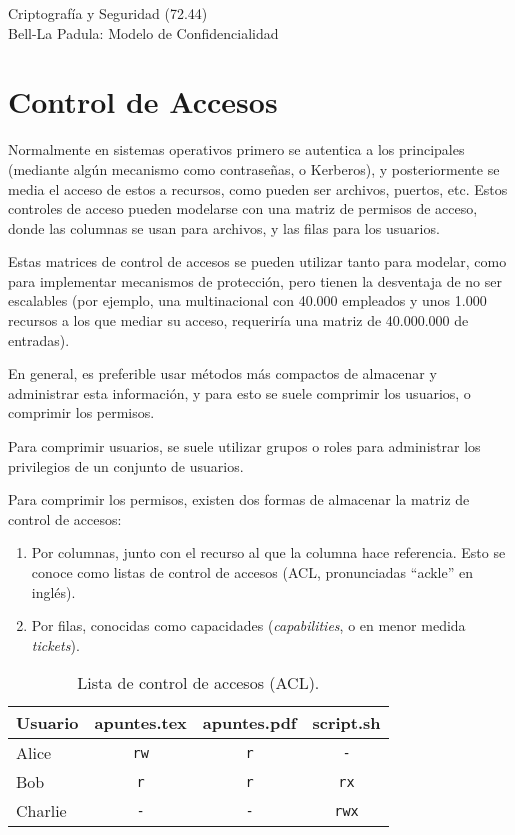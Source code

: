 \documentclass[main.tex]{subfiles}
\begin{document}
\begin{center}
\Large Criptografía y Seguridad (72.44)\\[.05cm]
Bell-La Padula: Modelo de Confidencialidad \\[.05cm]
\the\year
\end{center}

\vspace{0.2 cm}
\iffalse
\section{Control de Accesos}
Normalmente en sistemas operativos primero se autentica a los principales
(mediante algún mecanismo como contraseñas, o Kerberos), y posteriormente se
media el acceso de estos a recursos, como pueden ser archivos, puertos, etc.
Estos controles de acceso pueden modelarse con una matriz de permisos de acceso,
donde las columnas se usan para archivos, y las filas para los usuarios.

Estas matrices de control de accesos se pueden utilizar tanto para modelar, como
para implementar mecanismos de protección, pero tienen la desventaja de no ser
escalables (por ejemplo, una multinacional con 40.000 empleados y unos 1.000 recursos
a los que mediar su acceso, requeriría una matriz de 40.000.000 de entradas). 

En general, es preferible usar métodos más compactos de almacenar y administrar
esta información, y para esto se suele comprimir los usuarios, o comprimir los
permisos.

Para comprimir usuarios, se suele utilizar grupos o roles para administrar los
privilegios de un conjunto de usuarios.

Para comprimir los permisos, existen dos formas de almacenar la matriz
de control de accesos:
\begin{enumerate}
  \item Por columnas, junto con el recurso al que la columna hace referencia.
    Esto se conoce como listas de control de accesos (ACL, pronunciadas
    ``ackle'' en inglés).
  \item Por filas, conocidas como capacidades (\textit{capabilities}, o en menor
    medida \textit{tickets}).
\end{enumerate}

\begin{table}[h!]
  \centering
\begin{tabular}{l|c|c|c} 
 Usuario & apuntes.tex & apuntes.pdf & script.sh \\ 
 \hline
 Alice   & \verb+rw+   & \verb+r+    & \verb+-+ \\ 
 Bob     & \verb+r+    & \verb+r+    & \verb+rx+ \\ 
 Charlie & \verb+-+    & \verb+-+    & \verb+rwx+ \\
\end{tabular}
\caption{Lista de control de accesos (ACL).}
\end{table}
\end{document}
